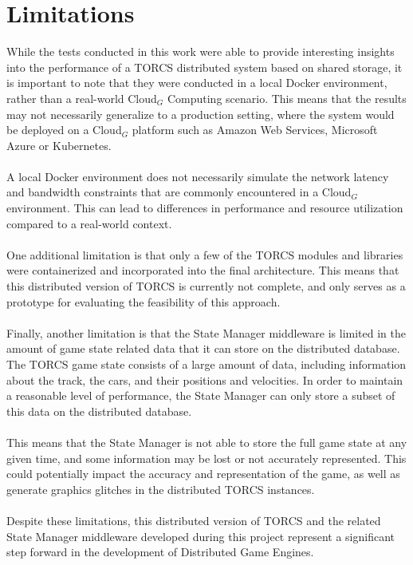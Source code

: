 \section{Limitations}
While the tests conducted in this work were able to provide interesting insights into the performance of a TORCS distributed system based on shared storage, it is important to note that they were conducted in a local Docker environment, rather than a real-world Cloud$_G$ Computing scenario. This means that the results may not necessarily generalize to a production setting, where the system would be deployed on a Cloud$_G$ platform such as Amazon Web Services, Microsoft Azure or Kubernetes. \\ \\
A local Docker environment does not necessarily simulate the network latency and bandwidth constraints that are commonly encountered in a Cloud$_G$ environment. This can lead to differences in performance and resource utilization compared to a real-world context. \\ \\
One additional limitation is that only a few of the TORCS modules and libraries were containerized and incorporated into the final architecture. This means that this distributed version of TORCS is currently not complete, and only serves as a prototype for evaluating the feasibility of this approach. \\ \\
Finally, another limitation is that the State Manager middleware is limited in the amount of game state related data that it can store on the distributed database. The TORCS game state consists of a large amount of data, including information about the track, the cars, and their positions and velocities. In order to maintain a reasonable level of performance, the State Manager can only store a subset of this data on the distributed database. \\ \\
This means that the State Manager is not able to store the full game state at any given time, and some information may be lost or not accurately represented. This could potentially impact the accuracy and representation of the game, as well as generate graphics glitches in the distributed TORCS instances. \\ \\
Despite these limitations, this distributed version of TORCS and the related State Manager middleware developed during this project represent a significant step forward in the development of Distributed Game Engines.

